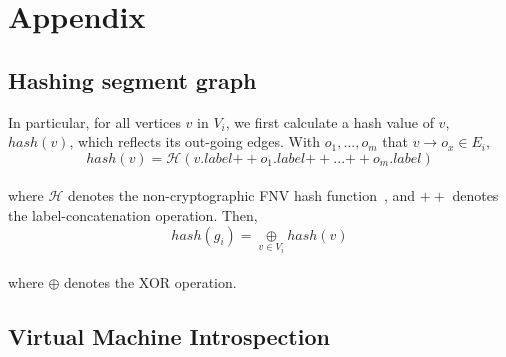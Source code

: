 \section{Appendix}


%


\subsection{Hashing segment graph}
\label{s:appendix:hash}
In particular, for all vertices $v$ in $V_i$, we first calculate a
hash value of $v$, $hash(v)$, which reflects its out-going edges. With
$o_1, ..., o_m$ that $v \rightarrow o_x \in E_i$,
%
%
\\[1pt]
\[
  hash(v) = \mathcal{H}(v.label {++} o_1.label {++} ... {++}
  o_m.label)
\]
\\[1pt]
%
where $\mathcal{H}$ denotes the
non-cryptographic FNV hash function~\cite{fnv, fnv-go}, and ${++}$
denotes the label-concatenation operation.
%
Then,
%
\\[1pt]
\[
  hash(g_i) = \underset{v \in V_i}{\oplus} hash(v)
\]
\\[1pt]
%
where $\oplus$ denotes the XOR operation.




\subsection{Virtual Machine Introspection}
\label{s:appendix:vmi}


